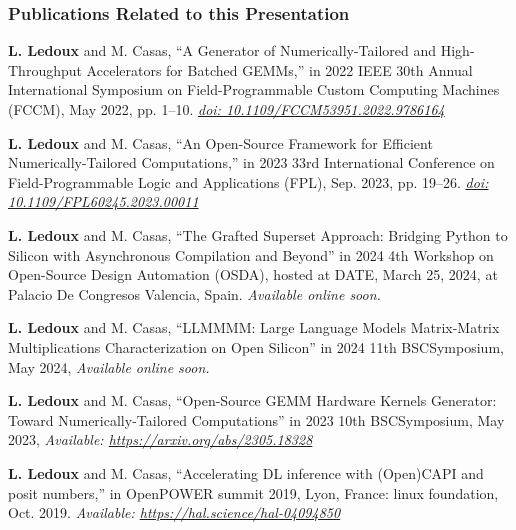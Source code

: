 \begin{frame}
\frametitle{Publications Related to this Presentation}
\scriptsize
\begin{myitemize}
	\item \textbf{L. Ledoux} and M. Casas, “A Generator of Numerically-Tailored and High-Throughput Accelerators for Batched GEMMs,” in 2022 IEEE 30th Annual International Symposium on Field-Programmable Custom Computing Machines (FCCM), May 2022, pp. 1–10. \textit{\url{doi: 10.1109/FCCM53951.2022.9786164}}
	\item \textbf{L. Ledoux} and M. Casas, “An Open-Source Framework for Efficient Numerically-Tailored Computations,” in 2023 33rd International Conference on Field-Programmable Logic and Applications (FPL), Sep. 2023, pp. 19–26. \textit{\url{doi: 10.1109/FPL60245.2023.00011}}
	\item \textbf{L. Ledoux} and M. Casas, “The Grafted Superset Approach: Bridging Python to Silicon with Asynchronous Compilation and Beyond” in 2024 4th Workshop on Open-Source Design Automation (OSDA), hosted at DATE, March 25, 2024, at Palacio De Congresos Valencia, Spain. \textit{Available online soon.}
	\item \textbf{L. Ledoux} and M. Casas, “LLMMMM: Large Language Models Matrix-Matrix Multiplications Characterization on Open Silicon” in 2024 11th BSCSymposium, May 2024, \textit{Available online soon.}
	\item \textbf{L. Ledoux} and M. Casas, “Open-Source GEMM Hardware Kernels Generator: Toward Numerically-Tailored Computations” in 2023 10th BSCSymposium, May 2023, \textit{Available: \url{https://arxiv.org/abs/2305.18328}}
	\item \textbf{L. Ledoux} and M. Casas, “Accelerating DL inference with (Open)CAPI and posit numbers,” in OpenPOWER summit 2019, Lyon, France: linux foundation, Oct. 2019. \textit{Available: \url{https://hal.science/hal-04094850}}

\end{myitemize}
\normalsize
\end{frame}


